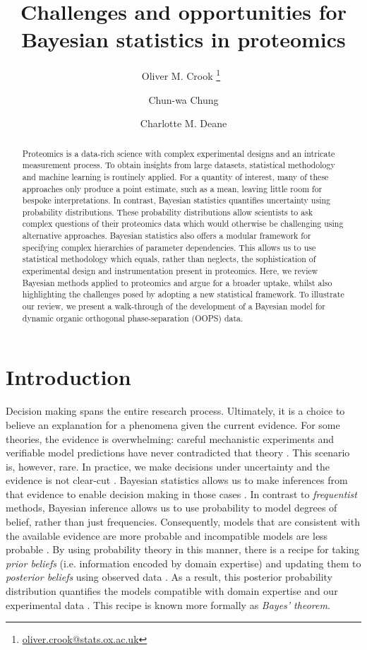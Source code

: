 \documentclass[12pt,english, journal=jpr, layout=twocolumn]{article}
\title{Challenges and opportunities for Bayesian statistics in proteomics}
\author[1]{Oliver M. Crook \thanks{\url{oliver.crook@stats.ox.ac.uk}}~}
\author[2]{Chun-wa Chung}
\author[1]{Charlotte M. Deane}
\affil[1]{Department of Statistics, University of Oxford, Oxford, UK}
\affil[2]{Structural and Biophysical Sciences, GlaxoSmithKline R\&D, Stevenage, UK}
\begin{document}
\maketitle
\begin{abstract}
Proteomics is a data-rich science with complex experimental designs and an intricate measurement process. To obtain insights from large datasets, statistical methodology and machine learning is routinely applied. For a quantity of interest, many of these approaches only produce a point estimate, such as a mean, leaving little room for bespoke interpretations. In contrast, Bayesian statistics quantifies uncertainty using probability distributions. These probability distributions allow scientists to ask complex questions of their proteomics data which would otherwise be challenging using alternative approaches. Bayesian statistics also offers a modular framework for specifying complex hierarchies of parameter dependencies. This allows us to use statistical methodology which equals, rather than neglects, the sophistication of experimental design and instrumentation present in proteomics. Here, we review Bayesian methods applied to proteomics and argue for a broader uptake, whilst also highlighting the challenges posed by adopting a new statistical framework. To illustrate our review, we present a walk-through of the development of a Bayesian model for dynamic organic orthogonal phase-separation (OOPS) data.      
\end{abstract}
\section{Introduction}
Decision making spans the entire research process. Ultimately, it is a choice to believe an explanation for a phenomena given the current evidence. For some theories, the evidence is overwhelming: careful mechanistic experiments and verifiable model predictions have never contradicted that theory \citep{Wilkie::1974}. This scenario is, however, rare. In practice, we make decisions under uncertainty and the evidence is not clear-cut \citep{Tversky::1974}. Bayesian statistics allows us to make inferences from that evidence to enable decision making in those cases \citep{Gelman::1995}. In contrast to \textit{frequentist} methods, Bayesian inference allows us to use probability to model degrees of belief, rather than just frequencies. Consequently, models that are consistent with the available evidence are more probable and incompatible models are less probable \citep{Gelman::2020, Schad::2021}. By using probability theory in this manner, there is a recipe for taking \textit{prior beliefs} (i.e. information encoded by domain expertise) and updating them to \textit{posterior beliefs} using observed data \citep{Gelman::1995}. As a result, this posterior probability distribution quantifies the models compatible with domain expertise and our experimental data \citep{Gelman::2020}. This recipe is known more formally as \textit{Bayes' theorem}. 
\end{document}
